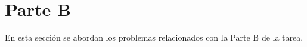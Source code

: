 \section{Parte B}
\label{sec:parteB}

En esta sección se abordan los problemas relacionados con la Parte B de la tarea.

